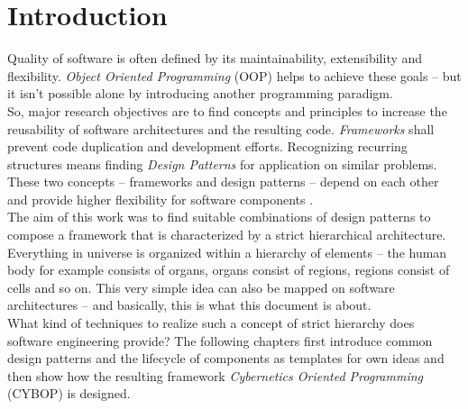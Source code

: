 %
%
%
%
%
%
%

\section{Introduction}
\label{introduction_heading}

Quality of software is often defined by its maintainability, extensibility and
flexibility. \emph{Object Oriented Programming} (OOP) helps to achieve these goals
-- but it isn't possible alone by introducing another programming paradigm.\\
So, major research objectives are to find concepts and principles to increase
the reusability of software architectures and the resulting code. \emph{Frameworks}
shall prevent code duplication and development efforts. Recognizing recurring
structures means finding \emph{Design Patterns} for application on similar problems.
These two concepts -- frameworks and design patterns -- depend on each other and
provide higher flexibility for software components \cite{pree}.\\
The aim of this work was to find suitable combinations of design patterns to
compose a framework that is characterized by a strict hierarchical architecture.
Everything in universe is organized within a hierarchy of elements -- the human
body for example consists of organs, organs consist of regions, regions consist
of cells and so on. This very simple idea can also be mapped on software
architectures -- and basically, this is what this document is about.\\
What kind of techniques to realize such a concept of strict hierarchy does software
engineering provide? The following chapters first introduce common design patterns
and the lifecycle of components as templates for own ideas and then show how the
resulting framework \emph{Cybernetics Oriented Programming} (CYBOP) \cite{cybop}
is designed.

